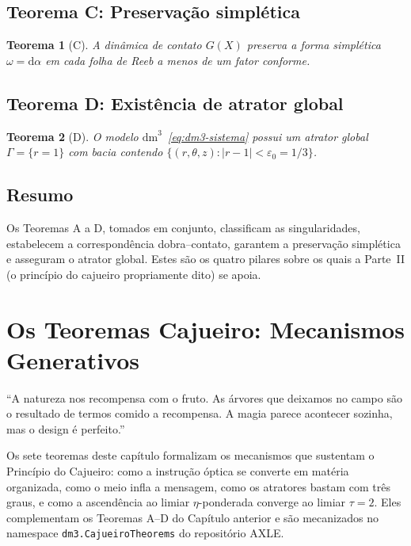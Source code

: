\documentclass[12pt,a4paper,twoside]{book}
\theoremstyle{plain}
\newtheorem{teorema}{Teorema}[section]
\theoremstyle{definition}
\theoremstyle{definition}
\newcommand{\epsz}{\varepsilon_{0}}
\newcommand{\dd}{\mathrm{d}}
\newcommand{\dm}{\mathrm{dm}^{3}}
\begin{document}
\section{Teorema C: Preservação simplética}

\begin{teorema}[C]\label{thm:C}
A dinâmica de contato $G(X)$ preserva a forma simplética
$\omega = \dd\alpha$ em cada folha de Reeb a menos de um fator conforme.
\end{teorema}

\section{Teorema D: Existência de atrator global}

\begin{teorema}[D]\label{thm:D}
O modelo $\dm$~\eqref{eq:dm3-sistema} possui um atrator global
$\Gamma = \{r=1\}$ com bacia contendo
$\{(r,\theta,z) : |r-1| < \epsz = 1/3\}$.
\end{teorema}

\section{Resumo}

Os Teoremas A a D, tomados em conjunto, classificam as singularidades,
estabelecem a correspondência dobra--contato, garantem a preservação
simplética e asseguram o atrator global. Estes são os quatro pilares
sobre os quais a Parte~II (o princípio do cajueiro propriamente dito)
se apoia.



\chapter{Os Teoremas Cajueiro: Mecanismos Generativos}
\label{cap:teoremas-C1-C7}

\epigraph{``A natureza nos recompensa com o fruto. As árvores que deixamos no campo
são o resultado de termos comido a recompensa. A magia parece acontecer sozinha,
mas o design é perfeito.''}{}

Os sete teoremas deste capítulo formalizam os mecanismos que sustentam o
Princípio do Cajueiro: como a instrução óptica se converte em matéria organizada,
como o meio infla a mensagem, como os atratores bastam com três graus, e como a
ascendência ao limiar $\eta$-ponderada converge ao limiar $\tau = 2$. Eles complementam os
Teoremas A--D do Capítulo anterior e são mecanizados no namespace
\texttt{dm3.CajueiroTheorems} do repositório AXLE.
\end{document}
